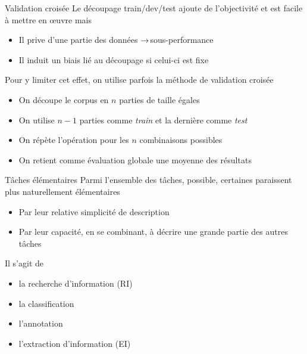 \documentclass[hyperref={unicode}, xcolor={svgnames}, french]{beamer}
\begin{document}
\begin{frame}[fragile]{Validation croisée}
    Le découpage train/dev/test ajoute de l'objectivité et est facile à mettre en œuvre mais
    \begin{itemize}
        \item Il prive d'une partie des données → sous-performance
        \item Il induit un biais lié au découpage si celui-ci est fixe
    \end{itemize}

    Pour y limiter cet effet, on utilise parfois la méthode de validation croisée
    \begin{itemize}
        \item<1-> On découpe le corpus en $n$ parties de taille égales
        \item<2-> On utilise $n-1$ parties comme \textcolor{highlight0}{\textit{train}} et la dernière comme \textcolor{highlight6}{\textit{test}}
        \item<3-> On répète l'opération pour les $n$ combinaisons possibles
        \item<12-> On retient comme évaluation globale une moyenne des résultats
    \end{itemize}
    \begin{center}
        \tikzset{external/export=true}
    \end{center}
\end{frame}

\begin{frame}{Tâches élémentaires}
    Parmi l'ensemble des tâches, possible, certaines paraissent plus naturellement élémentaires
    \begin{itemize}
        \item Par leur relative simplicité de description
        \item Par leur capacité, en se combinant, à décrire une grande partie des autres tâches
    \end{itemize}

    Il s'agit de
        \begin{itemize}
            \item la recherche d'information (RI)
            \item la classification
            \item l'annotation
            \item l'extraction d'information (EI)
        \end{itemize}
\end{frame}
\end{document}
